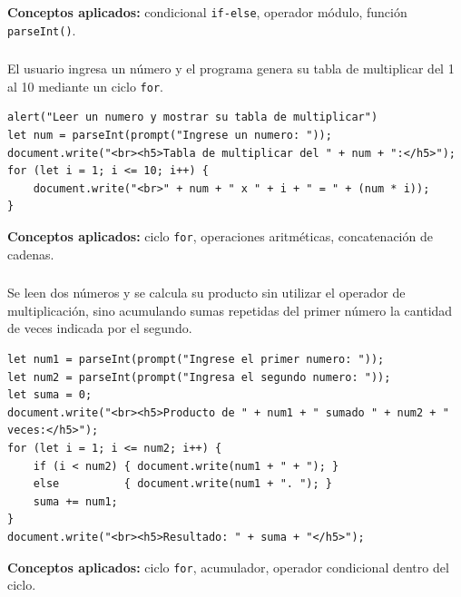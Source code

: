 \documentclass[10pt,a4paper]{article}
\begin{document}
\textbf{Conceptos aplicados:} condicional \texttt{if-else}, operador módulo, función \texttt{parseInt()}.

\subsubsection{\color{colorESCOM}{Ejercicio 2: Tabla de multiplicar}}

El usuario ingresa un número y el programa genera su tabla de multiplicar del 1 al 10 mediante un ciclo \texttt{for}.

\begin{lstlisting}[style=jsStyle, caption={Ejercicio 2 -- Tabla de multiplicar}]
alert("Leer un numero y mostrar su tabla de multiplicar")
let num = parseInt(prompt("Ingrese un numero: "));
document.write("<br><h5>Tabla de multiplicar del " + num + ":</h5>");
for (let i = 1; i <= 10; i++) {
    document.write("<br>" + num + " x " + i + " = " + (num * i));
}
\end{lstlisting}

\textbf{Conceptos aplicados:} ciclo \texttt{for}, operaciones aritméticas, concatenación de cadenas.

\subsubsection{\color{colorESCOM}{Ejercicio 3: Producto mediante sumas sucesivas}}

Se leen dos números y se calcula su producto sin utilizar el operador de multiplicación, sino acumulando sumas repetidas del primer número la cantidad de veces indicada por el segundo.

\begin{lstlisting}[style=jsStyle, caption={Ejercicio 3 -- Producto por sumas}]
let num1 = parseInt(prompt("Ingrese el primer numero: "));
let num2 = parseInt(prompt("Ingresa el segundo numero: "));
let suma = 0;
document.write("<br><h5>Producto de " + num1 + " sumado " + num2 + " veces:</h5>");
for (let i = 1; i <= num2; i++) {
    if (i < num2) { document.write(num1 + " + "); }
    else          { document.write(num1 + ". "); }
    suma += num1;
}
document.write("<br><h5>Resultado: " + suma + "</h5>");
\end{lstlisting}

\textbf{Conceptos aplicados:} ciclo \texttt{for}, acumulador, operador condicional dentro del ciclo.
\end{document}
